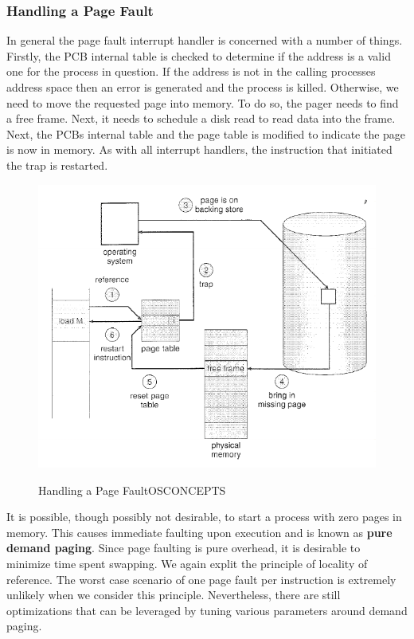 \documentclass[10pt,a4paper]{article}
\begin{document}
\subsubsection{Handling a Page Fault}
In general the page fault interrupt handler is concerned with a number of things. Firstly, the PCB internal table is checked to determine if the address is a valid one for the process in question. If the address is not in the calling processes address space then an error is generated and the process is killed. Otherwise, we need to move the requested page into memory. To do so, the pager needs to find a free frame. Next, it needs to schedule a disk read to read data into the frame. Next, the PCBs internal table and the page table is modified to indicate the page is now in memory. As with all interrupt handlers, the instruction that initiated the trap is restarted.
\begin{figure}
\caption{Handling a Page Fault{OSCONCEPTS}}
\begin{center}
\includegraphics[scale=0.45]{../images/page-fault.png}
\label{page-fault}
\end{center}
\end{figure}
It is possible, though possibly not desirable, to start a process with zero pages in memory. This causes immediate faulting upon execution and is known as {\bf pure demand paging}. Since page faulting is pure overhead, it is desirable to minimize time spent swapping. We again explit the principle of locality of reference. The worst case scenario of one page fault per instruction is extremely unlikely when we consider this principle. Nevertheless, there are still optimizations that can be leveraged by tuning various parameters around demand paging.
\end{document}
